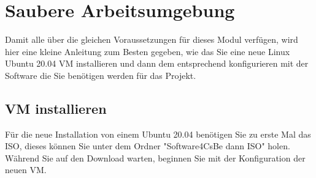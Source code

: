 

\section{Saubere Arbeitsumgebung}\label{sec:sauber}
\begin{frame}[fragile]
    Damit alle über die gleichen Voraussetzungen für dieses Modul verfügen, wird hier eine kleine Anleitung zum
    Besten gegeben, wie das Sie eine neue Linux Ubuntu 20.04 VM installieren und dann dem entsprechend konfigurieren
    mit der Software die Sie benötigen werden für das Projekt.
\end{frame}

\subsection{VM installieren}\label{subsec:vminstallieren}
\begin{frame}[fragile]
    Für die neue Installation von einem Ubuntu 20.04 benötigen Sie zu erste Mal das ISO, dieses können Sie
    unter dem Ordner "Software4CsBe dann ISO" holen.
    Während Sie auf den Download warten, beginnen Sie mit der Konfiguration der neuen VM.
\end{frame}

